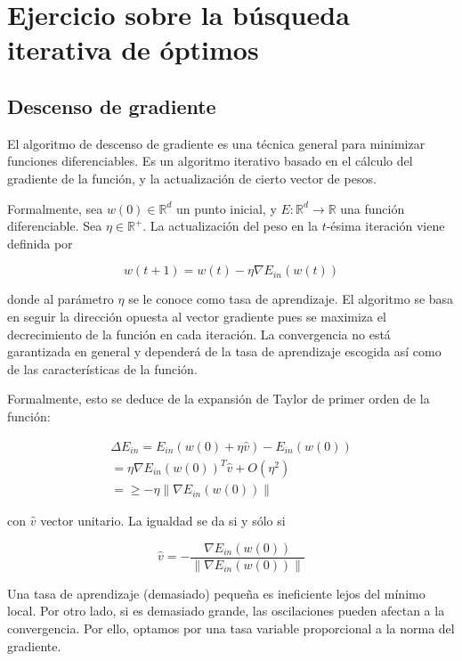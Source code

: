 \chapter{Ejercicio sobre la búsqueda iterativa de óptimos}

\section{Descenso de gradiente}

El algoritmo de descenso de gradiente es una técnica general para minimizar
funciones diferenciables. Es un algoritmo iterativo basado en el cálculo del
gradiente de la función, y la actualización de cierto vector de pesos.

Formalmente, sea $w(0) \in \mathbb{R}^d$ un punto inicial, y 
$E : \mathbb{R}^d \longrightarrow \mathbb R$
una función diferenciable. Sea $\eta \in \mathbb{R}^+$. La actualización del peso en 
la $t$-ésima iteración viene definida por 

\begin{equation*}
  w(t+1) = w(t) - \eta \nabla E_{in}(w(t))
\end{equation*}

donde al parámetro $\eta$ se le conoce como tasa de aprendizaje. El algoritmo se basa
en seguir la dirección opuesta al vector gradiente pues se maximiza el decrecimiento de
la función en cada iteración. La convergencia no está garantizada en general y dependerá
de la tasa de aprendizaje escogida así como de las características de la función. 

Formalmente, esto se deduce de la expansión de Taylor de primer orden de la función:
\cite{LFD}

\begin{equation}
\begin{aligned}
\Delta E_{in} = E_{in}(w(0) + \eta \hat{v}) - E_{in}(w(0)) \\
= \eta \nabla E_{in}(w(0))^T \hat{v} + O(\eta^2) \\
= \geq - \eta \lVert \nabla E_{in}(w(0)) \rVert
\end{aligned}
\end{equation}

con $\hat{v}$ vector unitario. La igualdad se da si y sólo si

\begin{equation*}
\hat{v} = - \frac{\nabla E_{in}(w(0))}{\lVert \nabla E_{in}(w(0)) \rVert}
\end{equation*}

Una tasa de aprendizaje (demasiado) pequeña es ineficiente lejos del mínimo local. 
Por otro lado, si es demasiado grande, las oscilaciones pueden afectan a la convergencia.
Por ello, optamos por una tasa variable proporcional a la norma del gradiente.

